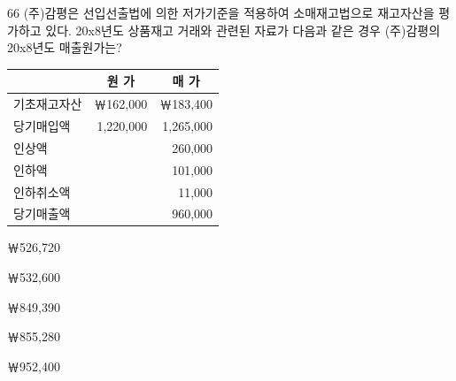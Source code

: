 \begin{question}{66}
(주)감평은 선입선출법에 의한 저가기준을 적용하여 소매재고법으로 재고자산을 평가하고 있다. 20x8년도 상품재고 거래와 관련된 자료가 다음과 같은 경우 (주)감평의 20x8년도 매출원가는?
\par{\small\centering
\begin{tabular}{|l|r|r|}
\hline
 & \multicolumn{1}{c|}{원 가} & \multicolumn{1}{c|}{매 가} \\ \hline
기초재고자산 & ￦162,000 & ￦183,400 \\ \hline
당기매입액 & 1,220,000 & 1,265,000 \\ \hline
인상액 & & 260,000 \\ \hline
인하액 & & 101,000 \\ \hline
인하취소액 & & 11,000 \\ \hline
당기매출액 & & 960,000 \\ \hline
\end{tabular}\par}
\begin{choices}
  \item ￦526,720
  \item ￦532,600
  \item ￦849,390
  \item ￦855,280
  \item ￦952,400
\end{choices}
\end{question}
